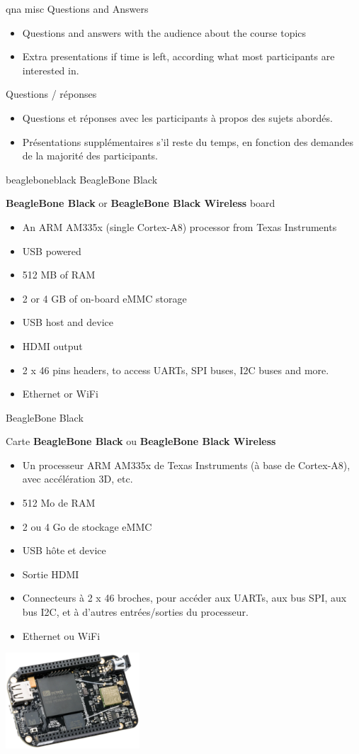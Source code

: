 {qna}
{misc}
{Questions and Answers}
{
  \begin{itemize}
  \item Questions and answers with the audience about the course topics
  \item Extra presentations if time is left, according what most
        participants are interested in.
  \end{itemize}
}
{Questions / réponses}
{
  \begin{itemize}
  \item Questions et réponses avec les participants à propos des sujets abordés.
  \item Présentations supplémentaires s'il reste du temps, en fonction des demandes
        de la majorité des participants.
  \end{itemize}
}


{beagleboneblack}
{BeagleBone Black}
{
  {\bf BeagleBone Black} or {\bf BeagleBone Black Wireless} board
  \begin{itemize}
  \item An ARM AM335x (single Cortex-A8) processor from Texas
    Instruments
  \item USB powered
  \item 512 MB of RAM
  \item 2 or 4 GB of on-board eMMC storage
  \item USB host and device
  \item HDMI output
  \item 2 x 46 pins headers, to access UARTs, SPI buses, I2C buses
    and more.
  \item Ethernet or WiFi
  \end{itemize}
  \vspace{-0.7cm}
}
{BeagleBone Black}
{
  Carte {\bf BeagleBone Black} ou {\bf BeagleBone Black Wireless}
  \begin{itemize}
  \item Un processeur ARM AM335x de Texas Instruments (à base de
    Cortex-A8), avec accélération 3D, etc.
  \item 512 Mo de RAM
  \item 2 ou 4 Go de stockage eMMC
  \item USB hôte et device
  \item Sortie HDMI
  \item Connecteurs à 2 x 46 broches, pour accéder aux UARTs, aux bus
    SPI, aux bus I2C, et à d'autres entrées/sorties du processeur.
  \item Ethernet ou WiFi
  \vspace{-0.7cm}
  \end{itemize}
}
{
  \begin{center}
    \includegraphics[width=5cm]{../slides/beagleboneblack-board/beagleboneblack_sd.png}
  \end{center}
}

